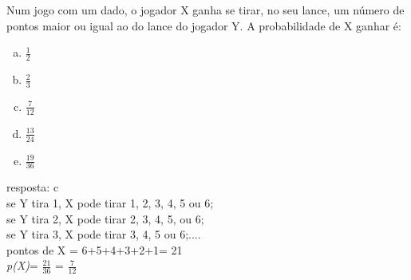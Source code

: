 \begin{ex}
    Num jogo com um dado, o jogador X ganha se tirar, no seu lance, um número de pontos maior ou igual ao do lance  do jogador Y. A probabilidade de X ganhar é: 
    
    \begin{enumerate}[(a)]
    \item $\frac{1}{2}$
    \item $\frac{2}{3}$
    \item $\frac{7}{12}$
    \item $\frac{13}{24}$
    \item $\frac{19}{36}$
    \end{enumerate}
\begin{sol}
     resposta: c \\
     se Y tira 1, X pode tirar 1, 2, 3, 4, 5 ou 6;\\
     se Y tira 2, X pode tirar 2, 3, 4, 5, ou 6; \\
     se Y tira 3, X pode tirar 3, 4, 5 ou 6;.... \\
     pontos de X = 6+5+4+3+2+1= 21 \\
     \textit{p(X)}= $\frac{21}{36}$ = $\frac{7}{12}$
     
\end{sol}
\end{ex}